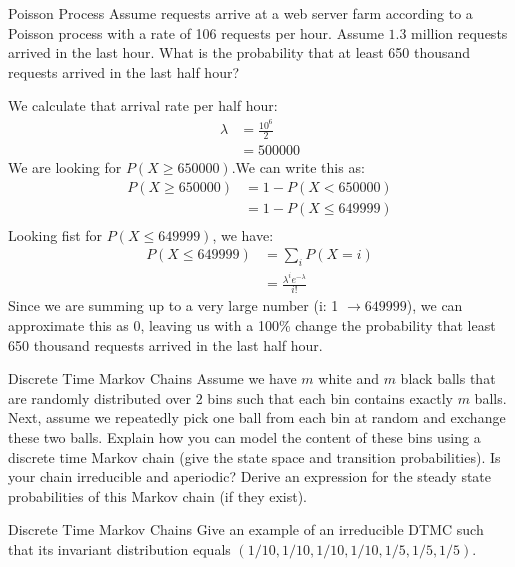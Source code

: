 \begin{problem}{Poisson Process}
Assume requests arrive at a web server farm according to a Poisson process with a rate of 106 requests per hour. Assume $1.3$ million requests arrived in the last hour. What is the probability that at least 650 thousand requests arrived in the last half hour?
\end{problem}
\begin{solution}
We calculate that arrival rate per half hour:
\begin{align*}
    \lambda &= \frac{10^6}{2}\\
    &= 500 000
\end{align*}
We are looking for $P(X\geq650 000)$.We can write this as:
\begin{align*}
    P(X\geq650 000)&= 1- P(X < 650 000)\\
    &= 1- P(X \leq 649 999)\\
\end{align*}
Looking fist for $P(X \leq 649 999)$, we have: 
\begin{align*}
    P(X \leq 649 999) &= \sum_i P(X=i)\\
    &= \frac{\lambda ^i e^{ -\lambda }}{i!}
\end{align*}
Since we are summing up to a very large number (i: 1 $\longrightarrow 649 999$), we can approximate this as 0, leaving us with a 100\% change the probability that least 650 thousand requests arrived in the last half hour.
\end{solution}

\begin{problem}{Discrete Time Markov Chains}
Assume we have $m$ white and $m$ black balls that are randomly distributed over $2$ bins such that each bin contains exactly $m$ balls. Next, assume we repeatedly pick one ball from each bin at random and exchange these two balls. Explain how you can model the content of these bins using a discrete time Markov chain (give the state space and transition probabilities). Is your chain irreducible and aperiodic? Derive an expression for the steady state probabilities of this Markov chain (if they exist).
\end{problem}

\begin{problem}{Discrete Time Markov Chains}
Give an example of an irreducible DTMC such that
its invariant distribution equals $(1/10, 1/10, 1/10, 1/10, 1/5, 1/5, 1/5)$.
\end{problem}

